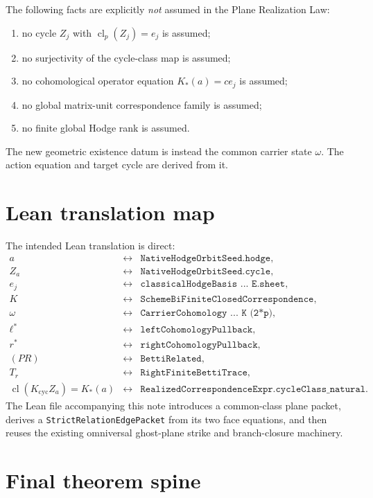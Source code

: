 \documentclass[11pt]{article}
\newcommand{\cl}{\operatorname{cl}}
\begin{document}
The following facts are explicitly \emph{not} assumed in the Plane Realization
Law:
\begin{enumerate}[label=(\alph*)]
  \item no cycle $Z_j$ with $\cl_p(Z_j)=e_j$ is assumed;
  \item no surjectivity of the cycle-class map is assumed;
  \item no cohomological operator equation $K_*(a)=c e_j$ is assumed;
  \item no global matrix-unit correspondence family is assumed;
  \item no finite global Hodge rank is assumed.
\end{enumerate}
The new geometric existence datum is instead the common carrier state $\omega$.
The action equation and target cycle are derived from it.

\section{Lean translation map}

The intended Lean translation is direct:
\[
\begin{array}{rcl}
  a &\leftrightarrow& \texttt{NativeHodgeOrbitSeed.hodge},\\
  Z_a &\leftrightarrow& \texttt{NativeHodgeOrbitSeed.cycle},\\
  e_j &\leftrightarrow& \texttt{classicalHodgeBasis ... E.sheet},\\
  K &\leftrightarrow& \texttt{SchemeBiFiniteClosedCorrespondence},\\
  \omega &\leftrightarrow& \texttt{CarrierCohomology ... K (2*p)},\\
  \ell^* &\leftrightarrow& \texttt{leftCohomologyPullback},\\
  r^* &\leftrightarrow& \texttt{rightCohomologyPullback},\\
  (PR) &\leftrightarrow& \texttt{BettiRelated},\\
  T_r &\leftrightarrow& \texttt{RightFiniteBettiTrace},\\
  \cl(K_{\mathrm{cyc}}Z_a)=K_*(a)
    &\leftrightarrow& \texttt{RealizedCorrespondenceExpr.cycleClass_natural}.
\end{array}
\]
The Lean file accompanying this note introduces a common-class plane packet,
derives a \texttt{StrictRelationEdgePacket} from its two face equations, and
then reuses the existing omniversal ghost-plane strike and branch-closure
machinery.

\section{Final theorem spine}
\end{document}
